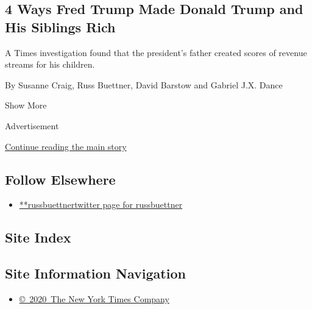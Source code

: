 \begin{enumerate}
  \hypertarget{4-ways-fred-trump-made-donald-trump-and-his-siblings-rich}{%
  \subsection{4 Ways Fred Trump Made Donald Trump and His Siblings
  Rich}\label{4-ways-fred-trump-made-donald-trump-and-his-siblings-rich}}

  A Times investigation found that the president's father created scores
  of revenue streams for his children.

  By Susanne Craig, Russ Buettner, David Barstow and Gabriel J.X. Dance
\end{enumerate}

Show More

Advertisement

\protect\hyperlink{after-mid2}{Continue reading the main story}

\hypertarget{follow-elsewhere}{%
\subsection{Follow Elsewhere}\label{follow-elsewhere}}

\begin{itemize}
\tightlist
\item
  \href{https://twitter.com/russbuettner}{**russbuettnertwitter page for
  russbuettner}
\end{itemize}

\hypertarget{site-index}{%
\subsection{Site Index}\label{site-index}}

\hypertarget{site-information-navigation}{%
\subsection{Site Information
Navigation}\label{site-information-navigation}}

\begin{itemize}
\tightlist
\item
  \href{https://help.nytimes3xbfgragh.onion/hc/en-us/articles/115014792127-Copyright-notice}{©~2020~The
  New York Times Company}
\end{itemize}

